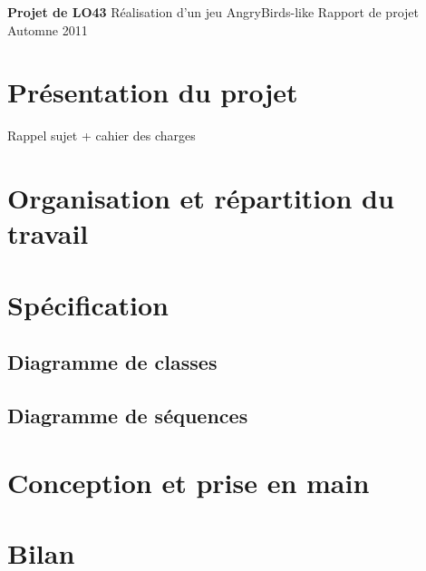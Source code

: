 \documentclass[a4paper,12pt]{report}
\begin{document}
{\textbf{Projet de LO43}} %
{Réalisation d'un jeu AngryBirds-like} %
{Rapport de projet} %
{Automne 2011} %
{} %
{} %

\tableofcontents
\chapter{Présentation du projet}
Rappel sujet + cahier des charges


\chapter{Organisation et répartition du travail}

\chapter{Spécification}
\section{Diagramme de classes}
\section{Diagramme de séquences}

\chapter{Conception et prise en main}

\chapter{Bilan}
\end{document}
